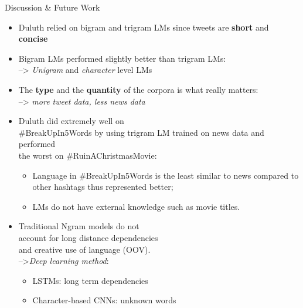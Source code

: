 \documentclass[final]{beamer}
\newlength{\onecolwid}
\begin{document}
\begin{frame}[t]
\begin{columns}[t]
\begin{column}{\onecolwid}
\begin{block}{Discussion \& Future Work}
\begin{itemize}
\item Duluth relied on bigram and trigram LMs since tweets are \textbf{short} and \textbf{concise}
\item Bigram LMs performed slightly better than trigram LMs: 
\\ --> \textit{Unigram} and \textit{character} level LMs 
\item The \textbf{type} and the \textbf{quantity} of the corpora is what really matters: 
\\ --> \textit{more tweet data, less news data}
\item Duluth did extremely well on
\vspace{3mm} 
\\\#BreakUpIn5Words by using trigram LM trained on news data and performed
\vspace{3mm}
\\the worst on \#RuinAChristmasMovie: 
\begin{itemize} 
\item \large Language in \#BreakUpIn5Words is the least similar to news compared to other hashtags thus represented better;  
\item \large LMs do not have external knowledge such as movie titles.
\end{itemize}
\item Traditional Ngram models do not 
\vspace{3mm}
\\account for long distance dependencies
\vspace{3mm} 
\\and creative use of language (OOV).
\vspace{3mm}
\\-->\textit{Deep learning method}: 
\begin{itemize}
\large \item LSTMs: long term dependencies
\large \item Character-based CNNs: unknown words
\end{itemize}
\end{itemize}
\end{block}




\end{column}
\end{columns}
\end{frame}
\end{document}

